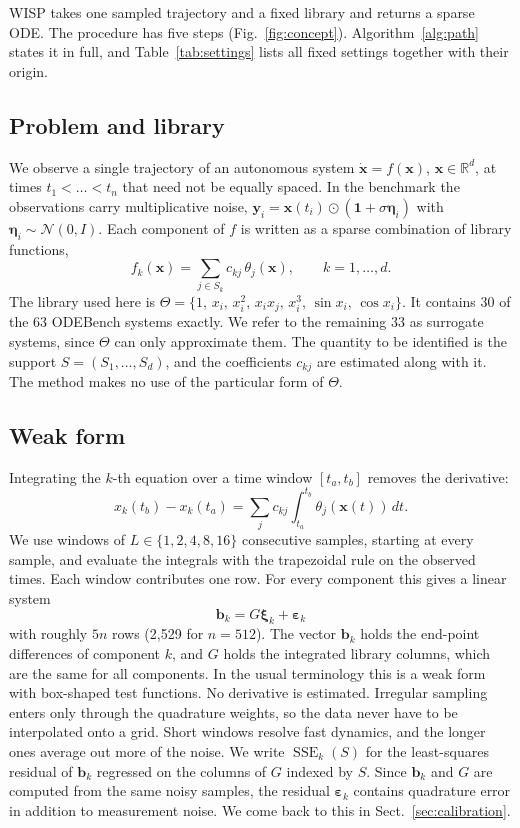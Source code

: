 \documentclass[10pt]{article}
\newcommand{\R}{\mathbb{R}}
\newcommand{\SSE}{\operatorname{SSE}}
\begin{document}
WISP takes one sampled trajectory and a fixed library and returns a sparse ODE. The procedure has five steps
(Fig.~\ref{fig:concept}). Algorithm~\ref{alg:path} states it in full, and Table~\ref{tab:settings} lists all fixed
settings together with their origin.

\subsection{Problem and library}
We observe a single trajectory of an autonomous system $\dot{\bm x}=f(\bm x)$, $\bm x\in\R^d$, at times
$t_1<\dots<t_n$ that need not be equally spaced. In the benchmark the observations carry multiplicative noise,
$\bm y_i=\bm x(t_i)\odot(\bm 1+\sigma\bm\eta_i)$ with $\bm\eta_i\sim\mathcal N(0,I)$. Each component of $f$ is written
as a sparse combination of library functions,
\begin{equation}
f_k(\bm x)=\sum_{j\in S_k}c_{kj}\,\theta_j(\bm x),\qquad k=1,\dots,d.
\end{equation}
The library used here is $\Theta=\{1,\,x_i,\,x_i^2,\,x_ix_j,\,x_i^3,\,\sin x_i,\,\cos x_i\}$. It contains 30 of the 63
ODEBench systems exactly. We refer to the remaining 33 as surrogate systems, since $\Theta$ can only approximate them.
The quantity to be identified is the support $S=(S_1,\dots,S_d)$, and the coefficients $c_{kj}$ are estimated along
with it. The method makes no use of the particular form of $\Theta$.

\subsection{Weak form}
Integrating the $k$-th equation over a time window $[t_a,t_b]$ removes the derivative:
\begin{equation}
x_k(t_b)-x_k(t_a)=\sum_j c_{kj}\int_{t_a}^{t_b}\theta_j(\bm x(t))\,dt .
\label{eq:weak}
\end{equation}
We use windows of $L\in\{1,2,4,8,16\}$ consecutive samples, starting at every sample, and evaluate the integrals with
the trapezoidal rule on the observed times. Each window contributes one row. For every component this gives a linear
system
\begin{equation}
\bm b_k=G\bm\xi_k+\bm\varepsilon_k
\end{equation}
with roughly $5n$ rows (2{,}529 for $n=512$). The vector $\bm b_k$ holds the end-point differences of component $k$,
and $G$ holds the integrated library columns, which are the same for all components. In the usual terminology this is
a weak form with box-shaped test functions. No derivative is estimated. Irregular sampling enters only through the
quadrature weights, so the data never have to be interpolated onto a grid. Short windows resolve fast dynamics, and
the longer ones average out more of the noise. We write $\SSE_k(S)$ for the least-squares residual of $\bm b_k$
regressed on the columns of $G$ indexed by $S$. Since $\bm b_k$ and $G$ are computed from the same noisy samples, the
residual $\bm\varepsilon_k$ contains quadrature error in addition to measurement noise. We come back to this in
Sect.~\ref{sec:calibration}.
\end{document}

